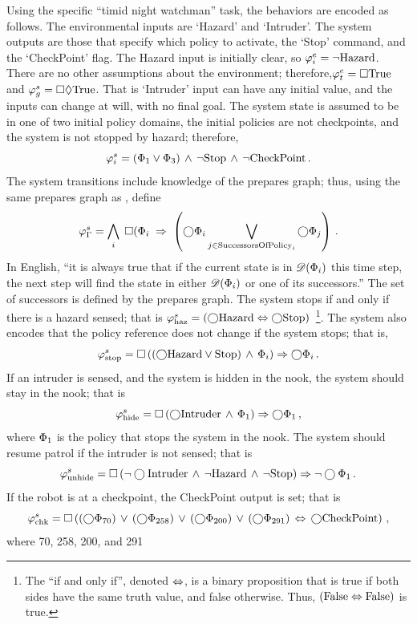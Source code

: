 Using the specific ``timid night watchman'' task, the behaviors are encoded as
follows.  The environmental inputs are `Hazard' and `Intruder'.  The system outputs
are those that specify which policy to activate, the `Stop' command, and the
`CheckPoint' flag.  The Hazard input is initially clear, so $\varphi_i^e =
\neg\mathrm{ Hazard }$.  There are no other assumptions about the environment;
therefore,$\varphi_t^e = \Box\mathrm{True}$ and $\varphi_g^s = \Box\Diamond\mathrm{True}$.
That is `Intruder' input can have any initial value, and the inputs can change at
will, with no final goal.  The system state is assumed to be in one of two initial
policy domains, the initial policies are not checkpoints, and the system is not
stopped by hazard; therefore,
\[\varphi_i^s = \left( \Phi_1
  \vee\Phi_3 \right)\,\wedge\,\neg\mathrm{Stop}\,\wedge\,\neg\mathrm{ CheckPoint }\,.\] 
The system transitions include knowledge of the prepares graph; thus, using the same
prepares graph as , define
\[\varphi_\Gamma^s = \bigwedge_i \;\Box(\Phi_i\;\Rightarrow\;\left( \bigcirc
  \Phi_i\bigvee_{j\in \mathrm{ SuccessorsOfPolicy }_i}\bigcirc \Phi_j \right)\,.
\] In English, ``it is always true that if the current state is in $\mathbf{\mathscr{D}}\!\left( \Phi_i \right)$ this
time step, the next step will find the state in either $\mathbf{\mathscr{D}}\!\left( \Phi_i \right)$ or one of its
successors.''  The set of successors is defined by the prepares graph.  The system
stops if and only if there is a hazard sensed; that is $\varphi_{\mathrm{ haz }}^s =
\left( \bigcirc\mathrm{ Hazard }\Leftrightarrow\bigcirc\mathrm{Stop} \right)$~\footnote{The ``if and only if'', denoted
  $\Leftrightarrow$, is a binary proposition that is true if both sides have the same truth
  value, and false otherwise.  Thus, $\left( \mathrm{False}\Leftrightarrow\mathrm{False} \right)$ is true.}.  The system
also encodes that the policy reference does not change if the system stops; that is,
\[\varphi_{\mathrm{ stop }}^s = \Box\left( \left( \bigcirc\mathrm{ Hazard }
    \vee\mathrm{Stop} \right)\,\wedge\,\Phi_i \right) \Rightarrow \bigcirc\Phi_i\,.\] If an intruder is
sensed, and the system is hidden in the nook, the system should stay in the nook;
that is
\[\varphi_{\mathrm{ hide }}^s =
\Box\left( \bigcirc\mathrm{ Intruder }\,\wedge\,\Phi_1 \right)\Rightarrow\bigcirc\Phi_1\,,\]
where $\Phi_1$ is the policy that stops the system in the nook.  The system should
resume patrol if the intruder is not sensed; that is
\[\varphi_{\mathrm{ unhide }}^s =
\Box\left( \neg\bigcirc\mathrm{ Intruder }\,\wedge\,\neg\mathrm{ Hazard }\,\wedge\,\neg\mathrm{Stop} \right)\Rightarrow\neg\bigcirc\Phi_1\,.\]
If the robot is at a checkpoint, the CheckPoint output is set; that is
\[\varphi_{\mathrm{ chk }}^s=\Box\left( \left( \bigcirc\Phi_{70} \right)\,\vee\, \left( \bigcirc\Phi_{258} \right)\,\vee\, \left( \bigcirc\Phi_{200} \right)\,\vee\,
  \left( \bigcirc\Phi_{291} \right)\,\Leftrightarrow\,\bigcirc\mathrm{ CheckPoint } \right)\,,\] where 70, 258, 200, and 291
